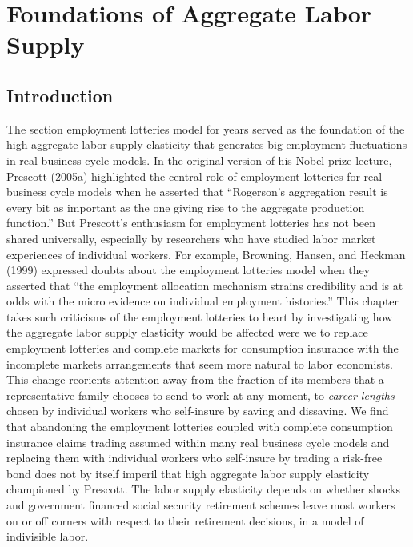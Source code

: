 
%


%
%
\def\lege{\raise.3ex\hbox{$>$\kern-.75em\lower1ex\hbox{$<$}}}

\chapter{Foundations of Aggregate Labor Supply\label{macrolaborII}}


\section{Introduction}

The  section  employment lotteries model   for years %
served as the foundation of the high aggregate labor supply
elasticity  that  generates big employment fluctuations   in   real business cycle models.
  In the original version of his Nobel prize lecture, Prescott (2005a) highlighted the central role of employment
lotteries  for real business cycle models when he asserted
that ``Rogerson's aggregation result is every bit as important as
the one giving rise to the aggregate production function.''
But Prescott's enthusiasm for employment lotteries has  not been shared universally, especially by
researchers who have studied labor market experiences of individual workers.  For example,
Browning, Hansen, and Heckman (1999)  expressed  doubts about the employment lotteries model
when they asserted  that ``the employment allocation
mechanism strains credibility and is at odds with the micro
evidence on individual employment histories.'' This chapter takes such criticisms of the employment lotteries
 to heart by
investigating how  the aggregate labor supply elasticity would be affected
were we to replace employment lotteries and complete markets for consumption insurance
with the incomplete markets arrangements that seem  more natural  to labor economists. This change reorients attention away from
the fraction of its members that a representative family chooses to send to work at any moment, to  {\it career lengths} chosen by individual workers who self-insure
by saving and dissaving.  We find that abandoning the employment lotteries coupled with
complete consumption insurance claims trading assumed within many real business cycle models and replacing them with individual workers who self-insure by trading
a risk-free bond does not by itself imperil that high aggregate labor supply elasticity championed by Prescott.  The labor supply elasticity
depends on whether shocks and
 government financed social security retirement schemes leave most workers on or off corners with respect to their retirement
decisions, in a model of indivisible labor.
%
%
%
%

